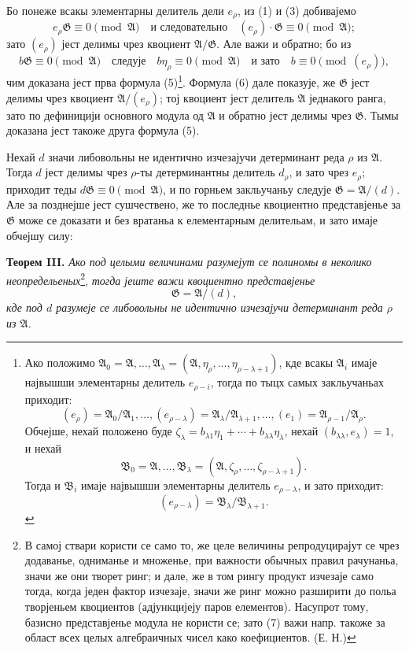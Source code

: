 \documentclass[11pt]{article}
\providecommand{\Amod}{\mathfrak A}
\providecommand{\Bmod}{\mathfrak B}
\providecommand{\Gmod}{\mathfrak G}
\providecommand{\zero}[1]{\equiv 0\pmod{#1}}
\begin{document}
Бо понеже всакы элементарны делитель дели $e_\rho$, из (1) и (3) добивајемо
\begin{equation}
 e_\rho\Gmod\zero{\Amod}\quad \text{и следовательно}\quad (e_\rho)\cdot\Gmod\zero{\Amod};
\tag{6}
\end{equation}
зато $(e_\rho)$ јест делимы чрез квоциент $\Amod/\Gmod$. Але важи и обратно; бо из
\[
 b\Gmod\zero{\Amod}
 \quad\text{следује}\quad b\eta_\rho\zero{\Amod}
 \quad\text{и зато}\quad b\zero{(e_\rho)},
\]
чим доказана јест прва формула (5)\footnote{Ако положимо $\Amod_0=\Amod,\ldots,\Amod_\lambda=(\Amod,\eta_\rho,\ldots,\eta_{\rho-\lambda+1})$, кде всакы $\Amod_i$ имаје највышши элементарны делитель $e_{\rho-i}$, тогда по тыцх самых закльучаньах приходит:
\[
 (e_\rho)=\Amod_0/\Amod_1,\ldots,(e_{\rho-\lambda})=\Amod_\lambda/\Amod_{\lambda+1},\ldots,(e_1)=\Amod_{\rho-1}/\Amod_\rho.
\]
Обчејше, нехай положено буде $\zeta_\lambda=b_{\lambda1}\eta_1+\cdots+b_{\lambda\lambda}\eta_\lambda$, нехай $(b_{\lambda\lambda},e_\lambda)=1$, и нехай
\[
 \Bmod_0=\Amod,\ldots,\Bmod_\lambda=(\Amod,\zeta_\rho,\ldots,\zeta_{\rho-\lambda+1}).
\]
Тогда и $\Bmod_i$ имаје највышши элементарны делитель $e_{\rho-\lambda}$, и зато приходит:
\[
 (e_{\rho-\lambda})=\Bmod_\lambda/\Bmod_{\lambda+1}.
\]}. Формула (6) дале показује, же $\Gmod$ јест делимы чрез квоциент $\Amod/(e_\rho)$; тој квоциент јест делитель $\Amod$ једнакого ранга, зато по дефиницији основного модула од $\Amod$ и обратно јест делимы чрез $\Gmod$. Тымы доказана јест такоже друга формула (5).

Нехай $d$ значи либовольны не идентично изчезајучи детерминант реда $\rho$ из $\Amod$. Тогда $d$ јест делимы чрез $\rho$-ты детерминантны делитель $d_\rho$, и зато чрез $e_\rho$; приходит теды $d\Gmod\zero{\Amod}$, и по горньем закльучаньу следује $\Gmod=\Amod/(d)$. Але за позднејше јест сушчествено, же то последнье квоциентно представјенье за $\Gmod$ може се доказати и без вратаньа к елементарным делительам, и зато имаје обчејшу силу:

\medskip
\noindent\textbf{Теорем III.} \emph{Ако под целыми величинами разумејут се полиномы в неколико неопредельеных}\footnote{В самој ствари користи се само то, же целе величины репродуцирајут се чрез додаванье, одниманье и множенье, при важности обычных правил рачунаньа, значи же они творет ринг; и дале, же в том рингу продукт изчезаје само тогда, когда једен фактор изчезаје, значи же ринг можно разширити до польа творјеньем квоциентов (адјункцијеју паров елементов). Насупрот тому, базисно представјенье модула не користи се; зато (7) важи напр. такоже за област всех целых алгебраичных чисел како коефициентов. (Е. Н.)}, \emph{тогда јеште важи квоциентно представјенье}
\begin{equation}
 \Gmod=\Amod/(d),
\tag{7}
\end{equation}
\emph{кде под $d$ разумеје се либовольны не идентично изчезајучи детерминант реда $\rho$ из $\Amod$.}
\end{document}
